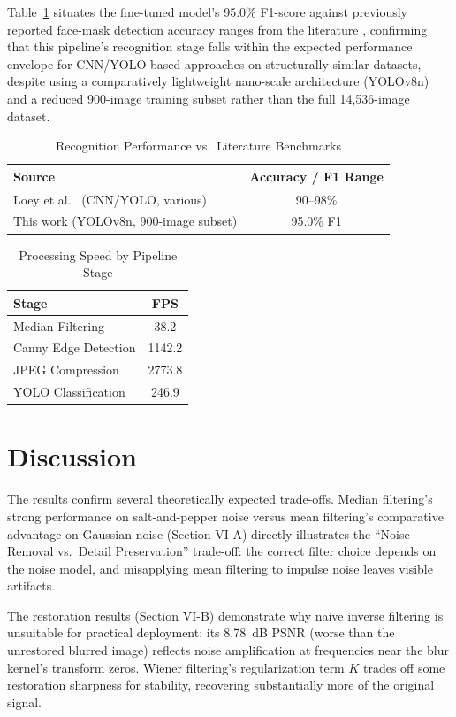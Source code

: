\documentclass[conference]{IEEEtran}
\begin{document}
Table~\ref{tab:literature} situates the fine-tuned model's 95.0\% F1-score against previously reported face-mask detection accuracy ranges from the literature \cite{b9}, confirming that this pipeline's recognition stage falls within the expected performance envelope for CNN/YOLO-based approaches on structurally similar datasets, despite using a comparatively lightweight nano-scale architecture (YOLOv8n) and a reduced 900-image training subset rather than the full 14,536-image dataset.

\begin{table}[h]
\caption{Recognition Performance vs.\ Literature Benchmarks}
\label{tab:literature}
\centering
\begin{tabular}{lc}
\toprule
Source & Accuracy / F1 Range \\
\midrule
Loey et al.\ \cite{b9} (CNN/YOLO, various) & 90--98\% \\
This work (YOLOv8n, 900-image subset) & 95.0\% F1 \\
\bottomrule
\end{tabular}
\end{table}

\begin{table}[h]
\caption{Processing Speed by Pipeline Stage}
\label{tab:fps}
\centering
\begin{tabular}{lc}
\toprule
Stage & FPS \\
\midrule
Median Filtering & 38.2 \\
Canny Edge Detection & 1142.2 \\
JPEG Compression & 2773.8 \\
YOLO Classification & 246.9 \\
\bottomrule
\end{tabular}
\end{table}

\section{Discussion}
The results confirm several theoretically expected trade-offs. Median filtering's strong performance on salt-and-pepper noise versus mean filtering's comparative advantage on Gaussian noise (Section VI-A) directly illustrates the ``Noise Removal vs.\ Detail Preservation'' trade-off: the correct filter choice depends on the noise model, and misapplying mean filtering to impulse noise leaves visible artifacts.

The restoration results (Section VI-B) demonstrate why naive inverse filtering is unsuitable for practical deployment: its 8.78~dB PSNR (worse than the unrestored blurred image) reflects noise amplification at frequencies near the blur kernel's transform zeros. Wiener filtering's regularization term $K$ trades off some restoration sharpness for stability, recovering substantially more of the original signal.
\end{document}
